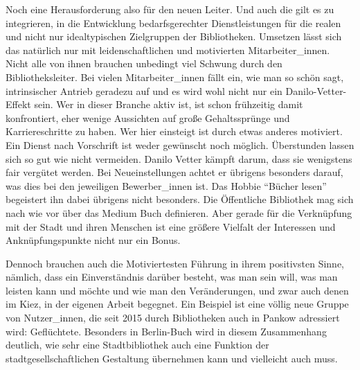 \documentclass[a4paper,
fontsize=11pt,
oneside,
numbers=noperiodatend,
parskip=half-,
bibliography=totoc,
final
]{scrartcl}
\begin{document}
Noch eine Herausforderung also für den neuen Leiter. Und auch die gilt
es zu integrieren, in die Entwicklung bedarfsgerechter Dienstleistungen
für die realen und nicht nur idealtypischen Zielgruppen der
Bibliotheken. Umsetzen lässt sich das natürlich nur mit
leidenschaftlichen und motivierten Mitarbeiter\_innen. Nicht alle von
ihnen brauchen unbedingt viel Schwung durch den Bibliotheksleiter. Bei
vielen Mitarbeiter\_innen fällt ein, wie man so schön sagt,
intrinsischer Antrieb geradezu auf und es wird wohl nicht nur ein
Danilo-Vetter-Effekt sein. Wer in dieser Branche aktiv ist, ist schon
frühzeitig damit konfrontiert, eher wenige Aussichten auf große
Gehaltssprünge und Karriereschritte zu haben. Wer hier einsteigt ist
durch etwas anderes motiviert. Ein Dienst nach Vorschrift ist weder
gewünscht noch möglich. Überstunden lassen sich so gut wie nicht
vermeiden. Danilo Vetter kämpft darum, dass sie wenigstens fair vergütet
werden. Bei Neueinstellungen achtet er übrigens besonders darauf, was
dies bei den jeweiligen Bewerber\_innen ist. Das Hobbie \enquote{Bücher
lesen} begeistert ihn dabei übrigens nicht besonders. Die Öffentliche
Bibliothek mag sich nach wie vor über das Medium Buch definieren. Aber
gerade für die Verknüpfung mit der Stadt und ihren Menschen ist eine
größere Vielfalt der Interessen und Anknüpfungspunkte nicht nur ein
Bonus.

Dennoch brauchen auch die Motiviertesten Führung in ihrem positivsten
Sinne, nämlich, dass ein Einverständnis darüber besteht, was man sein
will, was man leisten kann und möchte und wie man den Veränderungen, und
zwar auch denen im Kiez, in der eigenen Arbeit begegnet. Ein Beispiel
ist eine völlig neue Gruppe von Nutzer\_innen, die seit 2015 durch
Bibliotheken auch in Pankow adressiert wird: Geflüchtete. Besonders in
Berlin-Buch wird in diesem Zusammenhang deutlich, wie sehr eine
Stadtbibliothek auch eine Funktion der stadtgesellschaftlichen
Gestaltung übernehmen kann und vielleicht auch muss.
\end{document}

